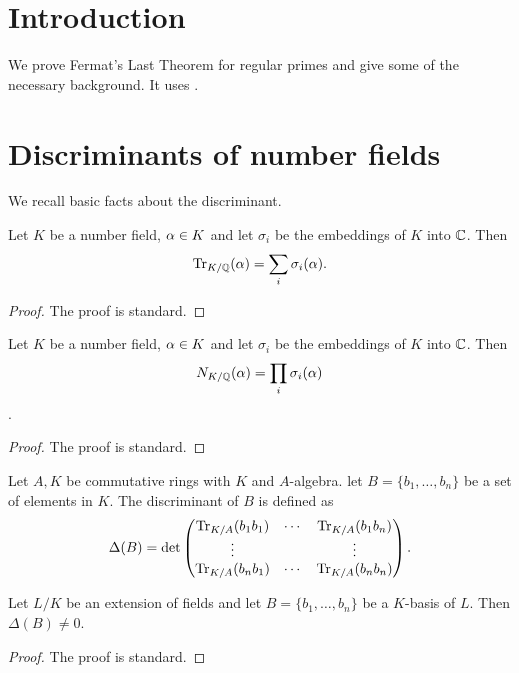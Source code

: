 	\maketitle
\tableofcontents
\section{Introduction}
We prove Fermat's Last Theorem for regular primes and give some of the necessary background. It uses \cite{Samuel,marcus,washington}.

\section{Discriminants of number fields}
We recall basic facts about the discriminant.
\begin{lemma}\label{lemma:alt_definition_of_trace}
    \leanok
	Let $K$ be a number field, $\alpha \in K$ and let $\sigma_i$ be the embeddings of $K$ into $\mathbb{C}$. Then \[\operatorname{Tr}_{K/\mathbb{Q}}(\alpha) =\sum_i \sigma_i(\alpha). \]
\end{lemma}
\begin{proof}
  \leanok
  The proof is standard.
\end{proof}

\begin{lemma}\label{lemma:alt_definition_of_norm}
    \leanok
	Let $K$ be a number field, $\alpha \in K$ and let $\sigma_i$ be the embeddings of $K$ into $\mathbb{C}$. Then \[N_{K/\mathbb{Q}}(\alpha)=\prod_i \sigma_i(\alpha)  \].
\end{lemma}
\begin{proof}
  \leanok
  The proof is standard.
\end{proof}

\begin{definition}\label{defn_of_disc}
	\leanok
	Let $A,K$ be commutative rings with $K$ and $A$-algebra. let $B=\{b_1,\dots,b_n\}$ be a set of elements in $K$. The discriminant of $B$ is defined as \[\Delta(B)=  \det \left (\begin{matrix} \operatorname{Tr}_{K/A}(b_1b_1) &\cdots& \operatorname{Tr}_{K/A}(b_1b_n)\\ \vdots & & \vdots \\  \operatorname{Tr}_{K/A}(b_nb_1) &\cdots& \operatorname{Tr}_{K/A}(b_nb_n)
	\end{matrix} \right ).\]
\end{definition}

\begin{lemma}\label{lem:lin_indep_iff_disc_ne_zero}
    \leanok
	Let $L/K$ be an extension of fields and let $B=\{b_1,\dots,b_n\}$ be a $K$-basis of $L$. Then $\Delta(B) \neq 0$.
\end{lemma}
\begin{proof}
  \leanok
  The proof is standard.
\end{proof}

